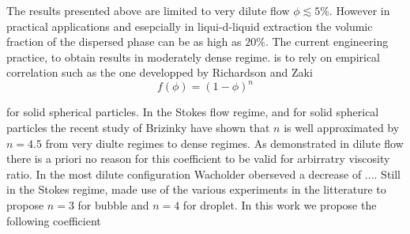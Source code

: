 







The results presented above are limited to very dilute flow $\phi \lesssim 5 \%$. However in practical applications and esepcially in liqui-d-liquid extraction the volumic fraction of the dispersed phase can be as high as $20\%$. The current engineering practice, to obtain results in moderately dense regime. is to rely on empirical correlation such as the one developped by Richardson and Zaki 
\begin{equation}
f(\phi) = (1-\phi)^n 
\end{equation}

for solid spherical particles. In the Stokes flow regime, and for solid spherical particles the recent study of Brizinky have shown that $n$ is well approximated by $n=4.5$ from very diulte regimes to dense regimes. As demonstrated in dilute flow there is a priori no reason for this coefficient to be valid for arbirratry viscosity ratio.  In the most dilute configuration Wacholder oberseved a decrease of .... Still in the Stokes regime, \citet{ishii1979drag} made use of the various experiments in the litterature to propose $n=3$ for bubble and $n=4$ for droplet. In this work we propose the following coefficient

